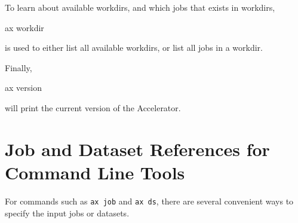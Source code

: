 To learn about available workdirs, and which jobs that exists in workdirs,
\begin{shell}
ax workdir
\end{shell}
is used to either list all available workdirs, or list all jobs in a
workdir.

Finally,
\begin{shell}
ax version
\end{shell}
will print the current version of the Accelerator.



\section{Job and Dataset References for Command Line Tools}
For commands such as \texttt{ax job} and \texttt{ax ds}, there are
several convenient ways to specify the input jobs or datasets.

